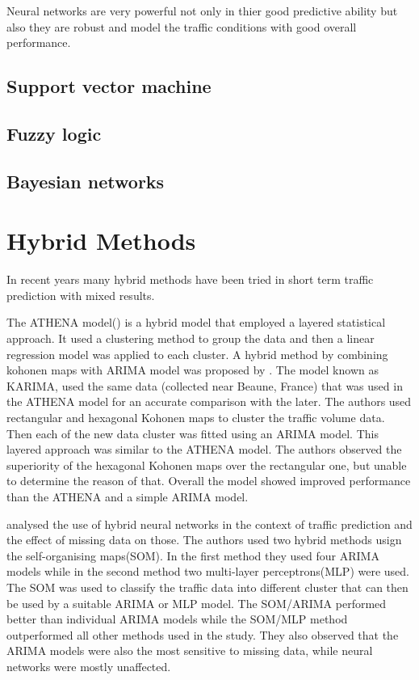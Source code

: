 Neural networks are very powerful not only in thier good predictive ability but also they are robust
and model the traffic conditions with good overall performance.

\subsection{Support vector machine}

\subsection{Fuzzy logic}

\citet{zhang2008short}

\subsection{Bayesian networks}

\citet{castillo2008predicting}


\section{Hybrid Methods}
In recent years many hybrid methods have been tried in short term traffic prediction with mixed
results.

The ATHENA model(\citet{danech1991athena}) is a hybrid model that employed a layered statistical
approach. It used a clustering method to group the data and then a linear regression model was applied
to each cluster. A hybrid method by combining kohonen maps with ARIMA model was proposed by
\citet{van1996combining}. The model known as KARIMA, used the same data (collected near Beaune,
France) that was used in the ATHENA model for an accurate comparison with the later. The authors
used rectangular and hexagonal Kohonen maps to cluster the traffic volume data. Then each of the
new data cluster was fitted using an ARIMA model. This layered approach was similar to the ATHENA
model. The authors observed the superiority of the hexagonal Kohonen maps over the rectangular one,
but unable to determine the reason of that. Overall the model showed improved performance than the
ATHENA and a simple ARIMA model.

\citet{chen2001study} analysed the use of hybrid neural networks in the context of traffic prediction
and the effect of missing data on those. The authors used two hybrid methods usign the self-organising
maps(SOM). In the first method they used four ARIMA models while in the second method two multi-layer
perceptrons(MLP) were used. The SOM was used to classify the traffic data into different cluster that
can then be used by a suitable ARIMA or MLP model. The SOM/ARIMA performed better than individual
ARIMA models while the SOM/MLP method outperformed all other methods used in the study. They also
observed that the ARIMA models were also the most sensitive to missing data, while neural networks
were mostly unaffected.

